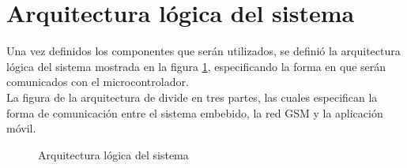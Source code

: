\section{Arquitectura lógica del sistema}
Una vez definidos los componentes que serán utilizados, se definió la arquitectura lógica del sistema mostrada en la figura \ref{fig:DisenoArquiLogica}, especificando la forma en que serán comunicados con el microcontrolador.\\

La figura de la arquitectura de divide en tres partes, las cuales especifican la forma de comunicación entre el sistema embebido, la red GSM y la aplicación móvil.\\

\begin{figure}[htbp!]
	\centering
	\caption{Arquitectura lógica del sistema}
	\label{fig:DisenoArquiLogica}
\end{figure}